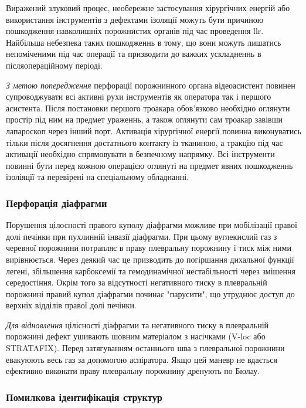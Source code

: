 \begin{refsection}
Виражений злуковий процес, необережне застосування хірургічних енергій або використання інструментів з дефектами ізоляції можуть бути причиною пошкодження навколишніх порожнистих органів під час проведення \acrshort{llr}. Найбільша небезпека таких пошкодженнь в тому, що вони можуть лишатись непоміченими під час операції та призводити до важких ускладненнь в післяопераційному періоді. 

\textit{З метою попередження} перфорації порожнинного органа відеоасистент повинен супроводжувати всі активні рухи інструментів як оператора так і першого асистента. Після постановки першого троакара обов'язково необхідно оглянути простір під ним на предмет ураженнь, а також оглянути сам троакар завівши лапароскоп через інший порт. Активація хірургічної енергії повинна виконуватись тільки після досягнення достатнього контакту із тканиною, а тракцію під час активації необхідно спрямовувати в безпечному напрямку. Всі інструменти повинні бути перед кожною операцією оглянуті на предмет явних пошкодженнь ізоліяції та перевірені на спеціальному обладнанні. 


\subsubsection{Перфорація діафрагми}

Порушення цілосності правого куполу діафрагми можливе при мобілізації правої долі печінки при пухлинній інвазії діафрагми. При цьому вуглекислий газ з черевної порожнини потрапляє в праву плевральну порожнину і тиск між ними вирівнюється. Через деякий час це призводить до погіршання дихальної функції легені, збільшення карбоксемії та гемодинамічної нестабільності через змішення середостіння. Окрім того за відсутності негативного тиску в плевральній порожнині правий купол діафрагми починає "парусити", що утруднює доступ до верхніх відділів правої долі печінки.

\textit{Для відновлення} цілісності діафрагми та негативного тиску в плевральній порожнині дефект ушивають шовним матеріалом з насічками (V-loc або STRATAFIX). Перед затягуванням останнього шва з плевральної порожнини евакуюють весь газ за допомогою аспіратора. Якщо цей маневр не вдається ефективно виконати праву плевральну порожнину дренують по Бюлау.

\subsubsection{Помилкова ідентифікація структур}


\end{refsection}
